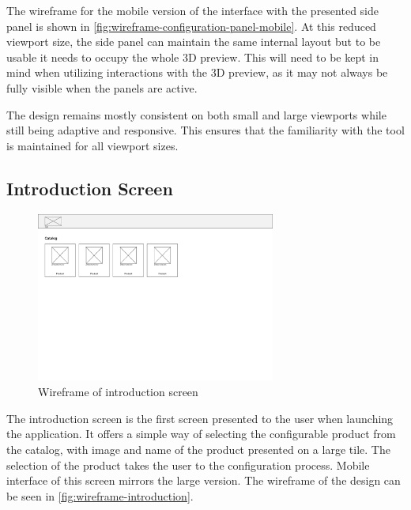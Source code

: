 The wireframe for the mobile version of the interface with the presented side panel is shown in \autoref{fig:wireframe-configuration-panel-mobile}. At this reduced viewport size, the side panel can maintain the same internal layout but to be usable it needs to occupy the whole 3D preview. This will need to be kept in mind when utilizing interactions with the 3D preview, as it may not always be fully visible when the panels are active. 

The design remains mostly consistent on both small and large viewports while still being adaptive and responsive. This ensures that the familiarity with the tool is maintained for all viewport sizes.

\subsection{Introduction Screen}

\begin{figure}[h!]
\centering
\includegraphics[width=0.7\textwidth]{images/wireframe_introduction_default.png}
\caption{Wireframe of introduction screen}
\label{fig:wireframe-introduction}
\end{figure}

The introduction screen is the first screen presented to the user when launching the application. It offers a simple way of selecting the configurable product from the catalog, with image and name of the product presented on a large tile. The selection of the product takes the user to the configuration process. Mobile interface of this screen mirrors the large version. The wireframe of the design can be seen in \autoref{fig:wireframe-introduction}.


